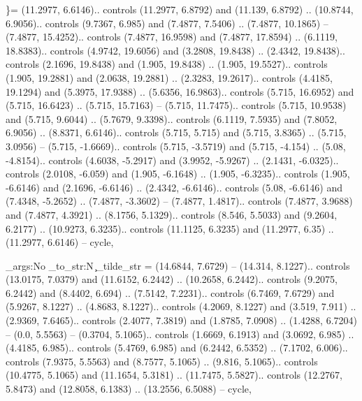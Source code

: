 \}= {(11.2977, 6.6146).. controls (11.2977, 6.8792) and (11.139, 6.8792) .. (10.8744, 6.9056).. controls (9.7367, 6.985) and (7.4877, 7.5406) .. (7.4877, 10.1865) -- (7.4877, 15.4252).. controls (7.4877, 16.9598) and (7.4877, 17.8594) .. (6.1119, 18.8383).. controls (4.9742, 19.6056) and (3.2808, 19.8438) .. (2.4342, 19.8438).. controls (2.1696, 19.8438) and (1.905, 19.8438) .. (1.905, 19.5527).. controls (1.905, 19.2881) and (2.0638, 19.2881) .. (2.3283, 19.2617).. controls (4.4185, 19.1294) and (5.3975, 17.9388) .. (5.6356, 16.9863).. controls (5.715, 16.6952) and (5.715, 16.6423) .. (5.715, 15.7163) -- (5.715, 11.7475).. controls (5.715, 10.9538) and (5.715, 9.6044) .. (5.7679, 9.3398).. controls (6.1119, 7.5935) and (7.8052, 6.9056) .. (8.8371, 6.6146).. controls (5.715, 5.715) and (5.715, 3.8365) .. (5.715, 3.0956) -- (5.715, -1.6669).. controls (5.715, -3.5719) and (5.715, -4.154) .. (5.08, -4.8154).. controls (4.6038, -5.2917) and (3.9952, -5.9267) .. (2.1431, -6.0325).. controls (2.0108, -6.059) and (1.905, -6.1648) .. (1.905, -6.3235).. controls (1.905, -6.6146) and (2.1696, -6.6146) .. (2.4342, -6.6146).. controls (5.08, -6.6146) and (7.4348, -5.2652) .. (7.4877, -3.3602) -- (7.4877, 1.4817).. controls (7.4877, 3.9688) and (7.4877, 4.3921) .. (8.1756, 5.1329).. controls (8.546, 5.5033) and (9.2604, 6.2177) .. (10.9273, 6.3235).. controls (11.1125, 6.3235) and (11.2977, 6.35) .. (11.2977, 6.6146) -- cycle},

{\exp_args:No \cs_to_str:N \c_tilde_str} = {(14.6844, 7.6729) -- (14.314, 8.1227).. controls (13.0175, 7.0379) and (11.6152, 6.2442) .. (10.2658, 6.2442).. controls (9.2075, 6.2442) and (8.4402, 6.694) .. (7.5142, 7.2231).. controls (6.7469, 7.6729) and (5.9267, 8.1227) .. (4.8683, 8.1227).. controls (4.2069, 8.1227) and (3.519, 7.911) .. (2.9369, 7.6465).. controls (2.4077, 7.3819) and (1.8785, 7.0908) .. (1.4288, 6.7204) -- (0.0, 5.5563) -- (0.3704, 5.1065).. controls (1.6669, 6.1913) and (3.0692, 6.985) .. (4.4185, 6.985).. controls (5.4769, 6.985) and (6.2442, 6.5352) .. (7.1702, 6.006).. controls (7.9375, 5.5563) and (8.7577, 5.1065) .. (9.816, 5.1065).. controls (10.4775, 5.1065) and (11.1654, 5.3181) .. (11.7475, 5.5827).. controls (12.2767, 5.8473) and (12.8058, 6.1383) .. (13.2556, 6.5088) -- cycle},
